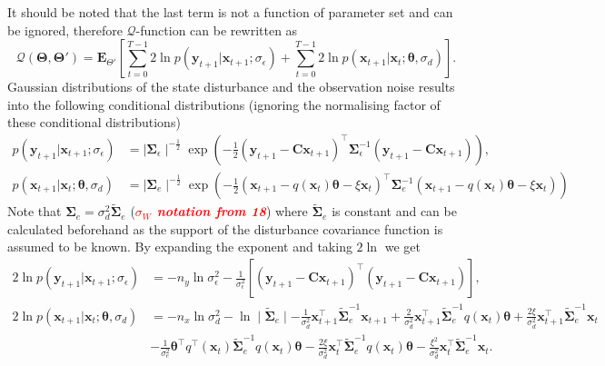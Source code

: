 \documentclass[]{article}
\newcommand{\dean}[1]{\textsf{\emph{\textbf{\textcolor{red}{#1}}}}}
\begin{document}
 It should be noted that the last term is not a function of parameter set and can be ignored, therefore $\mathcal Q$-function can be rewritten as
\begin{equation}\label{eq:QIntermsofJointDist}
\mathcal Q(\boldsymbol \Theta,\boldsymbol\Theta')=\mathbf E_{\Theta'}\left[\sum_{t=0}^{T-1}2\ln p(\mathbf y_{t+1}|\mathbf x_{t+1}; \sigma_{\epsilon})+\sum_{t=0}^{T-1}2\ln p(\mathbf x_{t+1}|\mathbf x_{t};\boldsymbol \theta ,\sigma_d)\right].
\end{equation}
Gaussian distributions of the state disturbance and the observation noise results into the following conditional distributions (ignoring the normalising factor of these conditional distributions)
\begin{align}
 p\left(\mathbf y_{t+1}|\mathbf x_{t+1};\sigma_{\epsilon}\right)&= \mid\boldsymbol\Sigma_{\epsilon}\mid^{-\frac{1}{2}}  \exp\left({-\frac{1}{2}\left(\mathbf y_{t+1}-\mathbf C\mathbf  x_{t+1}\right)^\top\boldsymbol\Sigma_{\epsilon}^{-1}\left(\mathbf y_{t+1}-\mathbf C\mathbf  x_{t+1}\right)}\right),\\
p(\mathbf x_{t+1}|\mathbf x_{t};\boldsymbol \theta ,\sigma_d)&= \mid\boldsymbol\Sigma_{e}\mid^{-\frac{1}{2}} \exp \left(-\frac{1}{2}(\mathbf x_{t+1}-q(\mathbf  x_t)\boldsymbol\theta-\xi  \mathbf x_t)^\top\boldsymbol\Sigma_e^{-1}(\mathbf x_{t+1}-q( \mathbf x_t)\boldsymbol\theta-\xi \mathbf  x_t) \right)
\end{align}
Note that $\boldsymbol\Sigma_e=\sigma_d^2\tilde{\boldsymbol\Sigma}_e$ (\dean{$\sigma_W$ notation from 18}) where $\tilde{\boldsymbol\Sigma}_e$ is constant and can be calculated beforehand as the support of the disturbance covariance function is assumed to be known. By expanding the exponent and taking $2\ln$ we get
\begin{align}\label{eq:CondititionDist1}
2\ln p\left(\mathbf y_{t+1}|\mathbf x_{t+1};\sigma_{\epsilon}\right)&=-n_y\ln \sigma_{\epsilon}^2-\frac{1}{\sigma_{\epsilon}^2}\left[ (\mathbf y_{t+1}-\mathbf C\mathbf  x_{t+1})^\top(\mathbf y_{t+1}-\mathbf C\mathbf  x_{t+1})\right],  \\
2\ln p(\mathbf x_{t+1}|\mathbf x_{t};\boldsymbol \theta ,\sigma_d)&=-n_x\ln\sigma_d^2-\ln\mid\tilde{\boldsymbol\Sigma}_e\mid-\frac{1}{\sigma_d^2}\mathbf x_{t+1}^\top\tilde{\boldsymbol\Sigma}_e^{-1}\mathbf x_{t+1}+\frac{2}{\sigma_d^2}\mathbf x_{t+1}^\top\tilde{\boldsymbol\Sigma}_e^{-1}q( \mathbf x_t)\boldsymbol\theta+\frac{2\xi}{\sigma_d^2}\mathbf x_{t+1}^\top\tilde{\boldsymbol\Sigma}_e^{-1}\mathbf x_t \nonumber \\
&-\frac{1}{\sigma_e^2}\boldsymbol\theta^\top q^\top(\mathbf x_t)\tilde{\boldsymbol\Sigma}_e^{-1}q(\mathbf x_t)\boldsymbol\theta-\frac{2\xi}{\sigma_d^2} \mathbf x_t^\top\tilde{\boldsymbol\Sigma}_e^{-1}q(\mathbf x_t)\boldsymbol\theta-\frac{\xi^2}{\sigma_d^2}\mathbf x_t^\top\tilde{\boldsymbol\Sigma}_e^{-1}\mathbf x_t. \label{eq:CondititionDist2}
\end{align}
\end{document}
